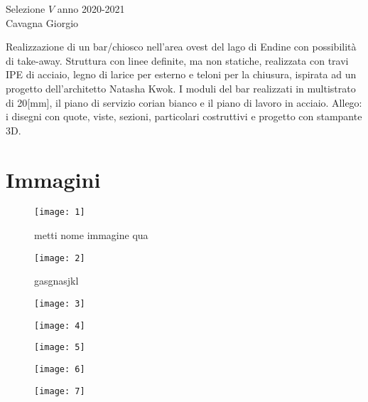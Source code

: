 \begin{center}
	\centering
	{\LARGE Selezione $V$ anno 2020-2021} \\
	\vspace{0.5cm}
	{\large Cavagna Giorgio}
	\vspace{0.5cm}
\end{center}

\noindent
Realizzazione di un bar/chiosco nell'area ovest del lago di Endine con possibilità di take-away.
Struttura con linee definite, ma non statiche, realizzata con travi IPE di acciaio, legno di larice per esterno e teloni per la chiusura, ispirata ad un progetto dell'architetto Natasha Kwok.
I moduli del bar realizzati in multistrato di 20[mm], il piano di servizio corian bianco e il piano di lavoro in acciaio.
Allego: i disegni con quote, viste, sezioni, particolari costruttivi e progetto con stampante 3D.


\clearpage
\section{Immagini}

\begin{figure}[H]
	\centering
	\texttt{[image: 1]}
	\caption{metti nome immagine qua}
\end{figure}

\begin{figure}[H]
	\centering
	\texttt{[image: 2]}
	\caption{gasgnasjkl}
\end{figure}

\begin{figure}[H]
	\centering
	\texttt{[image: 3]}
\end{figure}

\begin{figure}[H]
	\centering
	\texttt{[image: 4]}
\end{figure}

\newpage
\begin{figure}[H]
	\centering
	\texttt{[image: 5]}
\end{figure}

\begin{figure}[H]
	\centering
	\texttt{[image: 6]}
\end{figure}

\begin{figure}[H]
	\centering
	\texttt{[image: 7]}
\end{figure}

